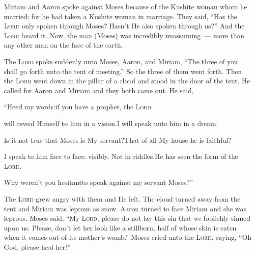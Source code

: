 
\begin{inparaenum}
   Miriam and Aaron spoke against Moses because of the Kushite woman whom he married; for he had taken a Kushite woman in marriage.%
   They said, ``Has the \textsc{Lord} only spoken through Moses? Hasn't He also spoken through us?'' And the \textsc{Lord} heard it.%
   Now, the man (Moses) was incredibly unassuming~--- more than any other man on the face of the earth.%
  
   The \textsc{Lord} spoke suddenly unto Moses, Aaron, and Miriam, ``The three of you shall go forth unto the tent of meeting.'' So the three of them went forth.%
   Then the \textsc{Lord} went down in the pillar of a cloud and stood in the door of the tent. He called for Aaron and Miriam and they both came out.%
   He said,\smallskip%
  
  \pb ``Heed my words:\pa if you have a prophet, the \textsc{Lord}%
  
  \pb will reveal Himself to him in a vision.\pa I will speak unto him in a dream.%
  
  \pa {} Is it not true that Moses is My servant?\pa That of all My house he is faithful?%
  
  \pa {} I speak to him face to face: visibly. Not in riddles.\pa He has seen the form of the \textsc{Lord}.%
  
  \pb Why weren't you hesitant\pa to speak against my servant Moses?''\smallskip%
  
  \noindent{} The \textsc{Lord} grew angry with them and He left.%
   The cloud turned away from the tent and Miriam was leprous as snow. Aaron turned to face Miriam and she was leprous.%
   Moses said, ``My \textsc{Lord}, please do not lay this sin that we foolishly sinned upon us.%
   Please, don't let her look like a stillborn, half of whose skin is eaten when it comes out of its mother's womb.''%
   Moses cried unto the \textsc{Lord}, saying, ``Oh God, please heal her!''%
  

\end{inparaenum}
